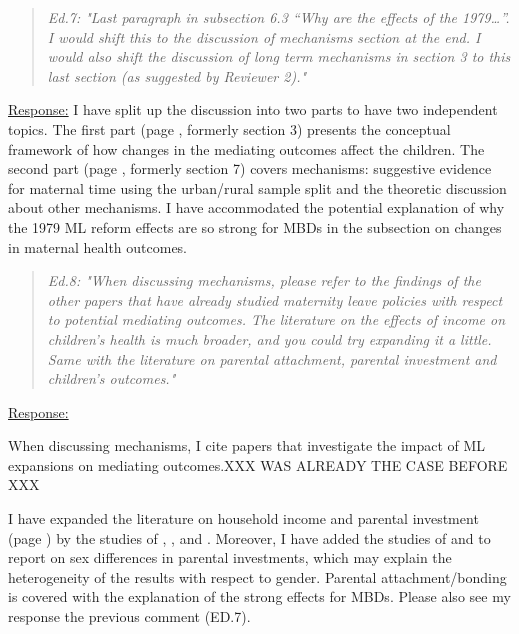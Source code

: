 \bigskip
{}
\begin{quote}
	\textit{Ed.7: "Last paragraph in subsection 6.3 “Why are the effects of the 1979…”. I would shift this to the discussion of mechanisms section at the end. I would also shift the discussion of long term mechanisms in section 3 to this last section (as suggested by Reviewer 2)."}
\end{quote}
\underline{Response:} I have split up the discussion into two parts to have two independent topics. The first part (page \pageref{rev_mlch: restructure_discussion_framework}, formerly section 3) presents the conceptual framework of how changes in the mediating outcomes affect the children. The second part (page \pageref{ref_mlch: discussion_mechanisms}, formerly section 7) covers mechanisms: suggestive evidence for maternal time using the urban/rural sample split and the theoretic discussion about other mechanisms. I have accommodated the potential explanation of why the 1979 ML reform effects are so strong for MBDs in the subsection on changes in maternal health outcomes.


\bigskip
{}
\begin{quote}
	\textit{Ed.8: "When discussing mechanisms, please refer to the findings of the other papers that have already studied maternity leave policies with respect to potential mediating outcomes. The literature on the effects of income on children’s health is much broader, and you could try expanding it a little. Same with the literature on parental attachment, parental investment and children’s outcomes."}
\end{quote}
\underline{Response:} 

{\color{red}When discussing mechanisms, I cite papers that investigate the impact of ML expansions on mediating outcomes.XXX WAS ALREADY THE CASE BEFORE XXX}

I have expanded the literature on household income and parental investment (page \pageref{rev_mlch: ed_literature_income_childhealth}) by the studies of \cite{milligan2011taxbenefits}, \cite{aizer2016cash-transfer}, and \cite{akee2018income}. Moreover, I have added the studies of \cite{baker2016} and \cite{bharadwaj2013discrimination} to report on sex differences in parental investments, which may explain the heterogeneity of the results with respect to gender. Parental attachment/bonding is covered with the explanation of the strong effects for MBDs. Please also see my response the previous comment (ED.7).

